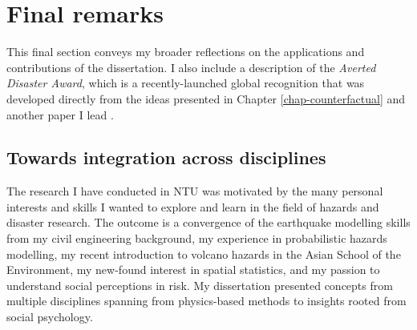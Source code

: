     


    



\section{Final remarks}

This final section conveys my broader reflections on the applications and contributions of the dissertation. I also include a description of the \textit{Averted Disaster Award}, which is a recently-launched global recognition that was developed directly from the ideas presented in Chapter \ref{chap-counterfactual} and another paper I lead \citep{lallemant_rabonza_gar_2022}.


\subsection{Towards integration across disciplines}

The research I have conducted in NTU was motivated by the many personal interests and skills I wanted to explore and learn in the field of hazards and disaster research. The outcome is a convergence of the earthquake modelling skills from my civil engineering background, my experience in probabilistic hazards modelling, my recent introduction to volcano hazards in the Asian School of the Environment, my new-found interest in spatial statistics, and my passion to understand social perceptions in risk. My dissertation presented concepts from multiple disciplines spanning from physics-based methods to insights rooted from social psychology. 

